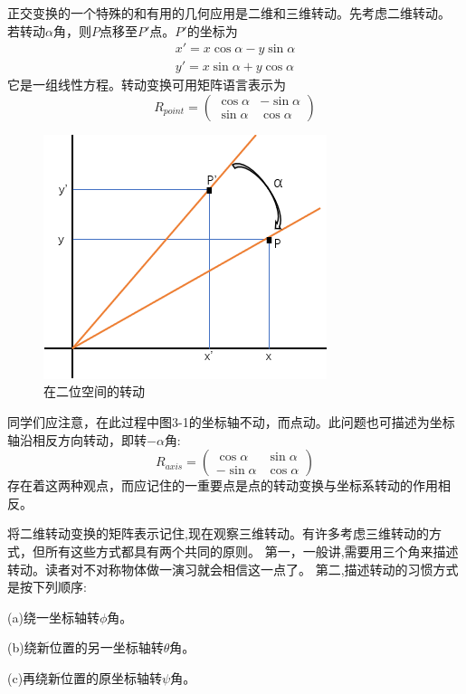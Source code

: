 正交变换的一个特殊的和有用的几何应用是二维和三维转动。先考虑二维转动。
若转动$\alpha$角，则$P$点移至$P'$点。$P'$的坐标为
\[
\begin{array}{c}
    x'=x\cos \alpha-y\sin\alpha \\ y'=x\sin\alpha+y\cos \alpha
\end{array}    
\tag{3-60}
\]
它是一组线性方程。转动变换可用矩阵语言表示为
\[
R_{point}=
\begin{pmatrix}
    \cos \alpha & -\sin\alpha \\
    \sin\alpha & \cos \alpha
\end{pmatrix}    
\tag{3-61}
\]
\begin{figure}[htbp]
    \centering
    \includegraphics[scale=0.8]{./fig/3-1.png}
    \caption{在二位空间的转动}
\end{figure}
同学们应注意，在此过程中图3-1的坐标轴不动，而点动。此问题也可描述为坐标轴沿相反方向转动，即转$-\alpha$角:
\[
R_{axis}=
\begin{pmatrix}
    \cos \alpha & \sin\alpha \\
    -\sin\alpha & \cos \alpha
\end{pmatrix}    
\tag{3-62}
\]
存在着这两种观点，而应记住的一重要点是点的转动变换与坐标系转动的作用相反。

将二维转动变换的矩阵表示记住,现在观察三维转动。有许多考虑三维转动的方式，但所有这些方式都具有两个共同的原则。
第一，一般讲,需要用三个角来描述转动。读者对不对称物体做一演习就会相信这一点了。
第二,描述转动的习惯方式是按下列顺序:

(a)绕一坐标轴转$\phi$角。

(b)绕新位置的另一坐标轴转$\theta$角。

(c)再绕新位置的原坐标轴转$\psi$角。

